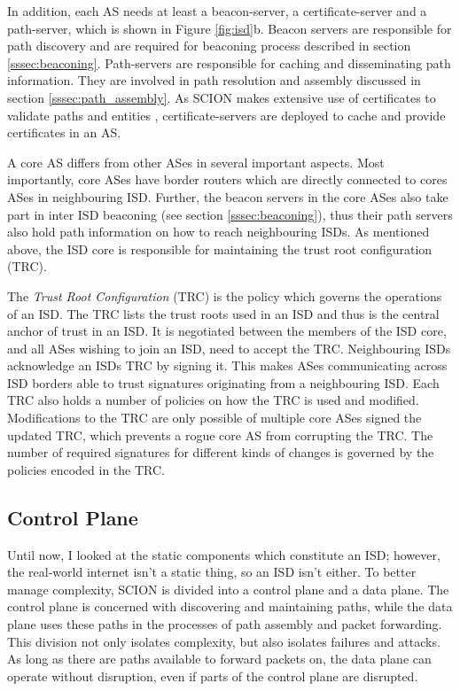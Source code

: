 \documentclass[../eva1_scion.tex]{subfiles}
\begin{document}
    In addition, each AS needs at least a beacon-server, a certificate-server and a path-server, which is shown in Figure \ref{fig:isd}b. Beacon servers are responsible for path discovery and are required for beaconing process described in section \ref{sssec:beaconing}. Path-servers are responsible for caching and disseminating path information. They are involved in path resolution and assembly discussed in section \ref{sssec:path_assembly}. As SCION makes extensive use of certificates to validate paths and entities \cite{scion_2011}, certificate-servers are deployed to cache and provide certificates in an AS.

    A core AS differs from other ASes in several important aspects. Most importantly, core ASes have border routers which are directly connected to cores ASes in neighbouring ISD. Further, the beacon servers in the core ASes also take part in inter ISD beaconing (see section \ref{sssec:beaconing}), thus their path servers also hold path information on how to reach neighbouring ISDs. As mentioned above, the ISD core is responsible for maintaining the trust root configuration (TRC).

    The \textit{Trust Root Configuration} (TRC) is the policy which governs the operations of an ISD. The TRC lists the trust roots used in an ISD and thus is the central anchor of trust in an ISD. It is negotiated between the members of the ISD core, and all ASes wishing to join an ISD, need to accept the TRC. Neighbouring ISDs acknowledge an ISDs TRC by signing it. This makes ASes communicating across ISD borders able to trust signatures originating from a neighbouring ISD. Each TRC also holds a number of policies on how the TRC is used and modified. Modifications to the TRC are only possible of multiple core ASes signed the updated TRC, which prevents a rogue core AS from corrupting the TRC. The number of required signatures for different kinds of changes is governed by the policies encoded in the TRC.

    \subsection{Control Plane} \label{ssec:control_plane}
    Until now, I looked at the static components which constitute an ISD; however, the real-world internet isn't a static thing, so an ISD isn't either. To better manage complexity, SCION is divided into a control plane and a data plane. The control plane is concerned with discovering and maintaining paths, while the data plane uses these paths in the processes of path assembly and packet forwarding. This division not only isolates complexity, but also isolates failures and attacks. As long as there are paths available to forward packets on, the data plane can operate without disruption, even if parts of the control plane are disrupted.
\end{document}
